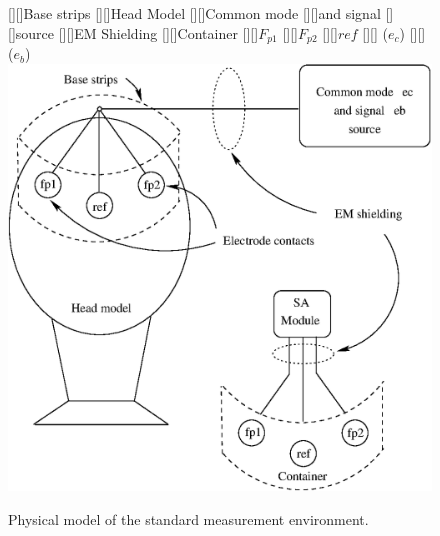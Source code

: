 \begin{figure}[htbp]
\begin{center}
	[][]{Base strips}
	[][]{Head Model}
	[][]{Common mode}							
	[][]{and signal }
	[][]{source}
	[][]{EM Shielding}
	[][]{Container}
	[][]{$F_{p1}$}				
	[][]{$F_{p2}$}
	[][]{$ref$}	
	[][]{ ($e_c$)}		
	[][]{ ($e_b$)}												
    \includegraphics[width=\textwidth]{standard-measurement-environment.eps}
    \caption{Physical model of the standard measurement environment.}
    \label{fig:standard-measurement-environment}
\end{center}
\end{figure}


